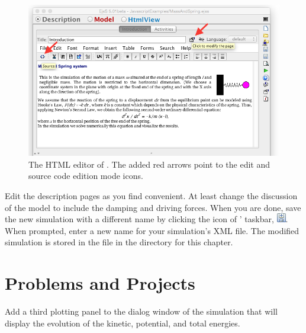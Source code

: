 \begin{figure}[htb]
    \centering
  \includegraphics[scale=\scale]{03ExplorationJavascript/images/ModifyHTML.png}
    \caption{The HTML editor of \ejs. The added red arrows point to the edit and source code edition mode icons.}
    \label{fig:03ExplorationJavascript/ModifyHTML}
\end{figure}

Edit the description pages as you find convenient. At least change the discussion of the model to include the damping and driving forces. When you are done, save the new simulation with a different name by clicking the  icon of \ejs' taskbar, \includegraphics[scale=\linescale]{../_common/icons_png/saveAsSmall.png}. When prompted, enter a new name for your simulation's XML file. The modified simulation is stored in the  file in the  directory for this chapter.

\section{Problems and Projects}\label{section:03ExplorationJavascriptProjects}

\begin{problem}[Energy]
Add a third plotting panel to the dialog window of the  simulation that will display the evolution of the kinetic, potential, and total energies.
\end{problem}

